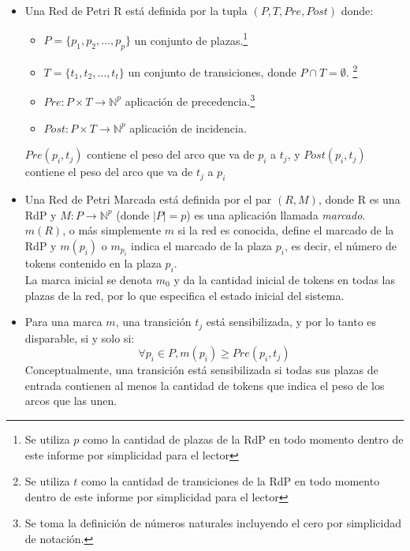 \begin{itemize}
  \item [\underline{Definición 1}:] Una Red de Petri R está definida por la
  tupla $(P, T, Pre, Post)$ donde:
  \begin{itemize}
    \item $ P = \{ p_1, p_2, \ldots, p_p \} $ un conjunto de plazas.\footnote{Se
    utiliza $p$ como la cantidad de plazas de la RdP en todo momento dentro de este informe por simplicidad para el lector}
    \item $ T = \{ t_1, t_2, \ldots, t_t \} $ un conjunto de transiciones, donde
    $ P \cap T = \emptyset $. \footnote{Se utiliza $t$ como la cantidad de
    transiciones de la RdP en todo momento dentro de este informe por
    simplicidad para el lector}
    \item $ Pre: P \times T \rightarrow \mathbb{N}^{p} $ aplicación de
    precedencia.\footnote{Se toma la definición de números naturales incluyendo
    el cero por simplicidad de notación.}
    \item $ Post: P \times T \rightarrow \mathbb{N}^{p} $ aplicación de
    incidencia.
  \end{itemize}
  $ Pre (p_i, t_j) $ contiene el peso del arco que va de $ p_i $ a $ t_j $, y
  $ Post (p_i, t_j) $ contiene el peso del arco que va de $ t_j $ a $ p_i $

  \item [\underline{Definición 2}:] Una Red de Petri Marcada está
  definida por el par $(R, M)$, donde R es una RdP y $ M : P \rightarrow
  \mathbb{N}^{p}$ (donde $\left\vert{P}\right\vert = p $) es una aplicación
  llamada \textit{marcado}.\\
  $m(R)$, o más simplemente $m$ si la red es conocida, define el marcado de la
  RdP y $m(p_{i})$ o $m_{p_{i}}$ indica el marcado de la plaza $p_{i}$, es
  decir, el número de tokens contenido en la plaza $p_{i}$.\\
  La marca inicial se denota $m_{0}$ y da la cantidad inicial de tokens en todas
  las plazas de la red, por lo que especifica el estado inicial del sistema.
  
  \item [\underline{Definición 3}:] Para una marca $m$, una transición $t_{j}$
  está sensibilizada, y por lo tanto es disparable, si y solo si:\\
  $$ \forall p_{i} \in P, m(p_i) \geq Pre(p_{i}, t_{j}) $$
  Conceptualmente, una transición está sensibilizada si todas sus plazas de
  entrada contienen al menos la cantidad de tokens que indica el peso de los
  arcos que las unen.


\end{itemize}
